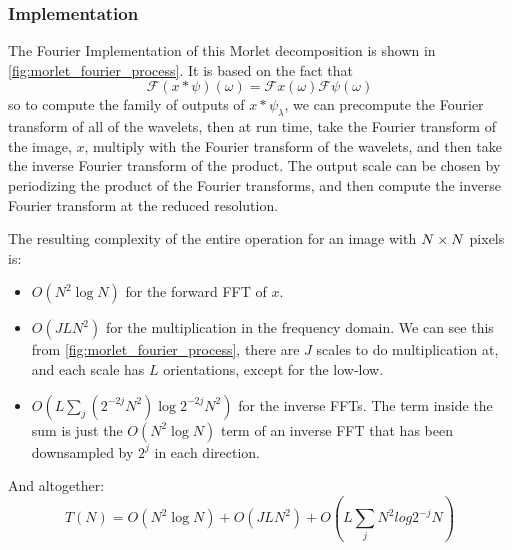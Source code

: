 \subsubsection{Implementation}\label{sec:morlet_implementation}
  The Fourier Implementation of this Morlet decomposition is shown in
  \autoref{fig:morlet_fourier_process}. It is based on the fact that 
  \begin{equation}
    \mathcal{F}(x \ast \psi)(\omega)
    = \mathcal{F}x(\omega)\mathcal{F}\psi(\omega)
  \end{equation}
  so to compute the family of outputs of $x\ast \psi_{\lambda}$, we can
  precompute the Fourier transform of all of the wavelets, then at run time,
  take the Fourier transform of the image, $x$, multiply with the Fourier
  transform of the wavelets, and then take the inverse Fourier transform of the
  product. The output scale can be chosen by periodizing the product of the
  Fourier transforms, and then compute the inverse Fourier transform at the
  reduced resolution.

  The resulting complexity of the entire operation for an image 
  with $N\times N$ pixels is:
  \begin{itemize}
    \item $O(N^{2} \log N)$ for the forward FFT of $x$.
    \item $O(JLN^{2})$ for the multiplication in the frequency domain. We can see
      this from \autoref{fig:morlet_fourier_process}, there are $J$ scales to
      do multiplication at, and each scale has $L$ orientations, except for the
      low-low.
    \item $O(L \sum_j (2^{-2j}N^{2}) \log {2^{-2j}N^{2}})$ for the inverse FFTs. The
      term inside the sum is just the $O(N^2\log N)$ term of an inverse FFT that
      has been downsampled by $2^j$ in each direction.
  \end{itemize}
  And altogether:
  \begin{equation}
    T(N) = O(N^2 \log N) + O (JLN^{2}) + O(L \sum_{j} N^{2} log 2^{-j} N)
    \label{eq:morlet_efficiency}
  \end{equation}

